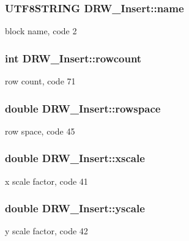 \subsubsection[{name}]{\setlength{\rightskip}{0pt plus 5cm}U\+T\+F8\+S\+T\+R\+I\+N\+G D\+R\+W\+\_\+\+Insert\+::name}\label{class_d_r_w___insert_aac767b55f89a1ba2f95a01573dde4302}
block name, code 2 \hypertarget{class_d_r_w___insert_ac9bc5494805108fd83f5e1851d12b90b}{}
\subsubsection[{rowcount}]{\setlength{\rightskip}{0pt plus 5cm}int D\+R\+W\+\_\+\+Insert\+::rowcount}\label{class_d_r_w___insert_ac9bc5494805108fd83f5e1851d12b90b}
row count, code 71 \hypertarget{class_d_r_w___insert_af9dde2e71b5fc348b0018c0e5c74d9cf}{}
\subsubsection[{rowspace}]{\setlength{\rightskip}{0pt plus 5cm}double D\+R\+W\+\_\+\+Insert\+::rowspace}\label{class_d_r_w___insert_af9dde2e71b5fc348b0018c0e5c74d9cf}
row space, code 45 \hypertarget{class_d_r_w___insert_a7b9b914c2570967914074f374ddbe9ef}{}
\subsubsection[{xscale}]{\setlength{\rightskip}{0pt plus 5cm}double D\+R\+W\+\_\+\+Insert\+::xscale}\label{class_d_r_w___insert_a7b9b914c2570967914074f374ddbe9ef}
x scale factor, code 41 \hypertarget{class_d_r_w___insert_a412f380485be38075b05976337102a47}{}
\subsubsection[{yscale}]{\setlength{\rightskip}{0pt plus 5cm}double D\+R\+W\+\_\+\+Insert\+::yscale}\label{class_d_r_w___insert_a412f380485be38075b05976337102a47}
y scale factor, code 42 \hypertarget{class_d_r_w___insert_a0f1cd0ef6b837894679b1135ce4bb132}{}
